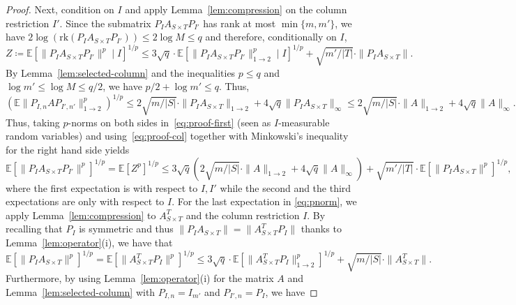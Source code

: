 \documentclass[reqno,a4paper]{amsart}
\theoremstyle{definition}
\begin{document}
\begin{proof}
Next, condition on $I$ and apply Lemma~\ref{lem:compression} on the column restriction $I'$. 
Since the submatrix $P_{I} A_{S\times T} P_{I'}$ has rank at most $\min\{m,m'\}$, we have $2\log(\text{rk}(P_I A_{S\times T} P_{I'})) \le 2\log M \le q$ and therefore, conditionally on $I$,
\begin{equation}\label{eq:proof-first}
        Z\coloneq \mathbb E [\|P_IA_{S\times T}P_{I'}\|^p\mid I]^{1/p}
        \le
        3\sqrt q\cdot \mathbb E
        [\|P_{I}A_{S\times T} P_{I'}\|^p_{1\to2}\mid I]^{1/p}
        +\sqrt{m'/|T|}\cdot \|P_{I}A_{S\times T}\|.
\end{equation}
By Lemma~\ref{lem:selected-column} and the inequalities $p\le q$ and $\log m' \le \log M \le q/2$, we have $p/2 + \log m' \le q$. Thus,
\begin{equation}\label{eq:proof-col}
        (\mathbb E \|P_{I,n}AP_{I',n'}\|^p_{1\to 2})^{1/p}
        \le
        2\sqrt{m/|S|}\cdot \|P_I A_{S\times T}\|_{1\to2}
        + 4\sqrt{q}\|P_I A_{S\times T}\|_\infty \le 2\sqrt{m/|S|}\cdot \|A\|_{1\to 2} + 4\sqrt{q}\|A\|_{\infty}.
\end{equation}
Thus, taking $p$-norms on both sides in~\eqref{eq:proof-first} (seen as $I$-measurable random variables) and using~\eqref{eq:proof-col} together with Minkowski's inequality for the right hand side yields
\begin{equation}\label{eq:pnorm}
\mathbb E[\|P_IA_{S\times T}P_{I'}\|^p]^{1/p} = \mathbb E[Z^p]^{1/p}\le
        3\sqrt{q} (2\sqrt{m/|S|}\cdot\|A\|_{1\to 2} + 4\sqrt{q}\|A\|_{\infty})
        +\sqrt{m'/|T|}\cdot \mathbb E[\|P_{I}A_{S\times T}\|^p]^{1/p},
\end{equation}
where the first expectation is with respect to $I,I'$ while the second and the third expectations are only with respect to $I$.
For the last expectation in \eqref{eq:pnorm}, we apply Lemma~\ref{lem:compression} to $A_{S\times T}^T$ and the column restriction $I$. 
By recalling that $P_I$ is symmetric and thus $\|P_IA_{S\times T}\|=\|A_{S\times T}^T P_I\|$ thanks to Lemma~\ref{lem:operator}(i), we have that
\begin{equation}\label{eq:proof-row}
\mathbb E[\|P_{I}A_{S\times T}\|^p]^{1/p} = \mathbb E [\|A_{S\times T}^T P_{I}\|^p]^{1/p}\le
        3\sqrt q\cdot \mathbb E[\|A_{S\times T}^T P_I\|^p_{1\to 2}]^{1/p}
        +\sqrt{m/|S|}\cdot\|A_{S\times T}^T\|.
\end{equation}
Furthermore, by using Lemma~\ref{lem:operator}(i) for the matrix $A$ and Lemma~\ref{lem:selected-column} with $P_{I,n}=I_{m'}$ and $P_{I',n}=P_I$, we have

\end{proof}
\end{document}
